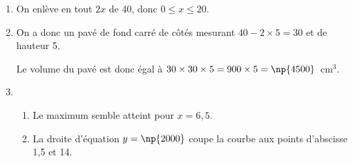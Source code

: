 
\medskip
 
%
 
\begin{enumerate}
\item %
On enlève en tout $2x$ de 40, donc $0 \leqslant x \leqslant 20$.
\item %

On a donc un pavé de fond carré de côtés mesurant $40 - 2 \times 5 = 30$ et de hauteur 5.

Le volume du pavé est donc égal à $30 \times 30 \times 5 = 900 \times 5 = \np{4500}$~cm$^3$. 
\item %

	\begin{enumerate}
		\item %
Le maximum semble atteint pour $x = 6,5$. 
		\item %
		
La droite d'équation $y = \np{2000}$ coupe la courbe aux points d'abscisse 1,5 et 14.
	\end{enumerate} 
\end{enumerate}

